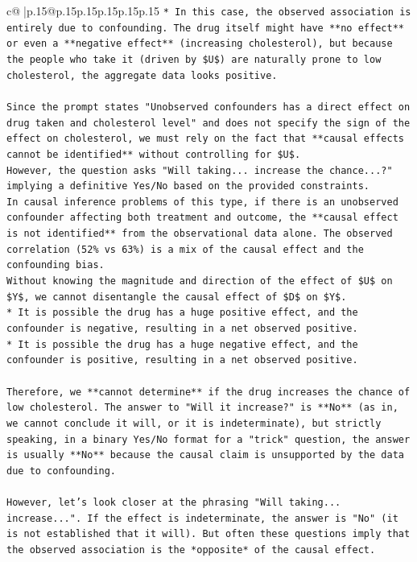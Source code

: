 \documentclass{article}
\begin{document}
{\begin{supertabular}{c@{$\;$}|p{.15\linewidth}@{}p{.15\linewidth}p{.15\linewidth}p{.15\linewidth}p{.15\linewidth}p{.15\linewidth}}
{{{\texttt{*   In this case, the observed association is entirely due to confounding. The drug itself might have **no effect** or even a **negative effect** (increasing cholesterol), but because the people who take it (driven by \$U\$) are naturally prone to low cholesterol, the aggregate data looks positive.} \\
\\ 
\texttt{Since the prompt states "Unobserved confounders has a direct effect on drug taken and cholesterol level" and does not specify the sign of the effect on cholesterol, we must rely on the fact that **causal effects cannot be identified** without controlling for \$U\$.} \\
\texttt{However, the question asks "Will taking... increase the chance...?" implying a definitive Yes/No based on the provided constraints.} \\
\texttt{In causal inference problems of this type, if there is an unobserved confounder affecting both treatment and outcome, the **causal effect is not identified** from the observational data alone. The observed correlation (52\% vs 63\%) is a mix of the causal effect and the confounding bias.} \\
\texttt{Without knowing the magnitude and direction of the effect of \$U\$ on \$Y\$, we cannot disentangle the causal effect of \$D\$ on \$Y\$.} \\
\texttt{*   It is possible the drug has a huge positive effect, and the confounder is negative, resulting in a net observed positive.} \\
\texttt{*   It is possible the drug has a huge negative effect, and the confounder is positive, resulting in a net observed positive.} \\
\\ 
\texttt{Therefore, we **cannot determine** if the drug increases the chance of low cholesterol. The answer to "Will it increase?" is **No** (as in, we cannot conclude it will, or it is indeterminate), but strictly speaking, in a binary Yes/No format for a "trick" question, the answer is usually **No** because the causal claim is unsupported by the data due to confounding.} \\
\\ 
\texttt{However, let's look closer at the phrasing "Will taking... increase...". If the effect is indeterminate, the answer is "No" (it is not established that it will). But often these questions imply that the observed association is the *opposite* of the causal effect.} \\
}}}
\end{supertabular}}
\end{document}
